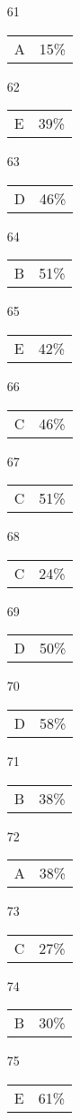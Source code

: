 \documentclass[12pt]{article}
\begin{document}
\begin{multicols}{5}
\begin{enumerate}
\item[61] \begin{tabular}{cc} A & 15\%\end{tabular}
\item[62] \begin{tabular}{cc} E & 39\%\end{tabular}
\item[63] \begin{tabular}{cc} D & 46\%\end{tabular}
\item[64] \begin{tabular}{cc} B & 51\%\end{tabular}
\item[65] \begin{tabular}{cc} E & 42\%\end{tabular}
\item[]
\item[66] \begin{tabular}{cc} C & 46\%\end{tabular}
\item[67] \begin{tabular}{cc} C & 51\%\end{tabular}
\item[68] \begin{tabular}{cc} C & 24\%\end{tabular}
\item[69] \begin{tabular}{cc} D & 50\%\end{tabular}
\item[70] \begin{tabular}{cc} D & 58\%\end{tabular}
\item[]
\item[71] \begin{tabular}{cc} B & 38\%\end{tabular}
\item[72] \begin{tabular}{cc} A & 38\%\end{tabular}
\item[73] \begin{tabular}{cc} C & 27\%\end{tabular}
\item[74] \begin{tabular}{cc} B & 30\%\end{tabular}
\item[75] \begin{tabular}{cc} E & 61\%\end{tabular}

\end{enumerate}
\end{multicols}
\end{document}
